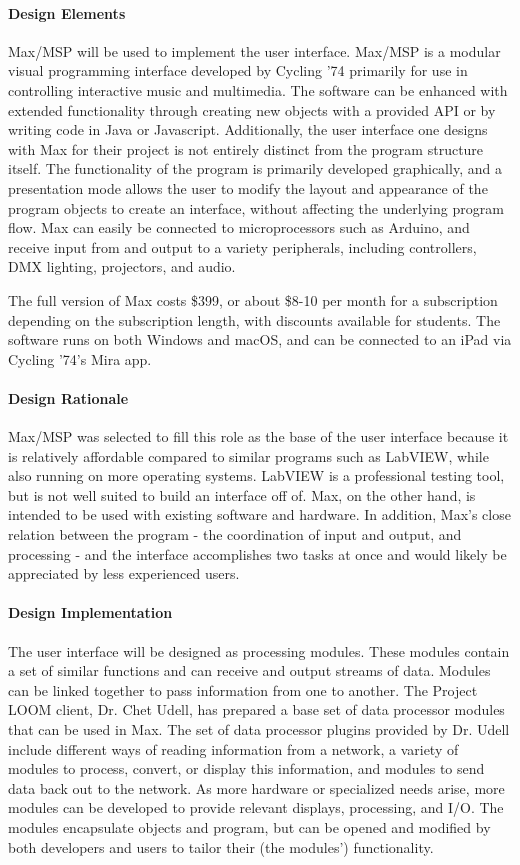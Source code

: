 \documentclass[onecolumn, draftclsnofoot,10pt, compsoc]{IEEEtran}
\begin{document}
\paragraph{Design Elements}
Max/MSP will be used to implement the user interface. Max/MSP is a modular visual programming interface developed by Cycling '74 primarily for use in controlling interactive music and multimedia. The software can be enhanced with extended functionality through creating new objects with a provided API or by writing code in Java or Javascript. Additionally, the user interface one designs with Max for their project is not entirely distinct from the program structure itself. The functionality of the program is primarily developed graphically, and a presentation mode allows the user to modify the layout and appearance of the program objects to create an interface, without affecting the underlying program flow. Max can easily be connected to microprocessors such as Arduino, and receive input from and output to a variety peripherals, including controllers, DMX lighting, projectors, and audio. \cite{max}

The full version of Max costs \$399, or about \$8-10 per month for a subscription depending on the subscription length, with discounts available for students. The software runs on both Windows and macOS, and can be connected to an iPad via Cycling '74's Mira app. \cite{buymax}

\paragraph{Design Rationale}
Max/MSP was selected to fill this role as the base of the user interface because it is relatively affordable compared to similar programs such as LabVIEW, while also running on more operating systems. LabVIEW is a professional testing tool, but is not well suited to build an interface off of. Max, on the other hand, is intended to be used with existing software and hardware. In addition, Max's close relation between the program - the coordination of input and output, and processing - and the interface accomplishes two tasks at once and would likely be appreciated by less experienced users.

\paragraph{Design Implementation}
The user interface will be designed as processing modules. These modules contain a set of similar functions and can receive and output streams of data. Modules can be linked together to pass information from one to another. The Project LOOM client, Dr. Chet Udell, has prepared a base set of data processor modules that can be used in Max. The set of data processor plugins provided by Dr. Udell include different ways of reading information from a network, a variety of modules to process, convert, or display this information, and modules to send data back out to the network. As more hardware or specialized needs arise, more modules can be developed to provide relevant displays, processing, and I/O. The modules encapsulate objects and program, but can be opened and modified by both developers and users to tailor their (the modules') functionality.
\end{document}
